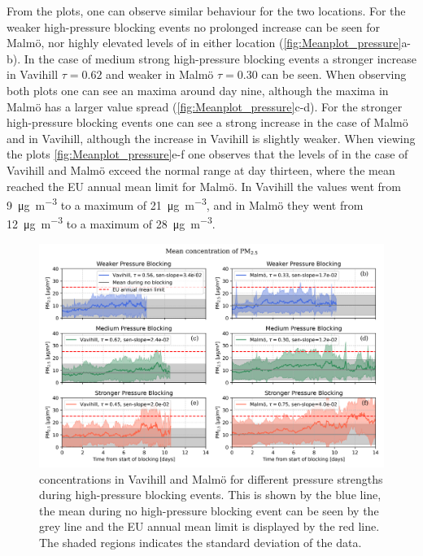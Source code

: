 From the plots, one can observe similar behaviour for the two locations. For the weaker high-pressure blocking events no prolonged increase can be seen for Malmö, nor highly elevated levels of \PM in either location (\autoref{fig:Meanplot_pressure}a-b). In the case of medium strong high-pressure blocking events a stronger increase in Vavihill $\tau=0.62$ and weaker in Malmö $\tau=0.30$ can be seen. When observing both plots one can see an maxima around day nine, although the maxima in Malmö has a larger value spread (\autoref{fig:Meanplot_pressure}c-d). For the stronger high-pressure blocking events one can see a strong increase in the case of Malmö and in Vavihill, although the increase in Vavihill is slightly weaker. When viewing the plots \autoref{fig:Meanplot_pressure}e-f one observes that the levels of \PM in the case of Vavihill and Malmö exceed the normal range at day thirteen, where the mean reached the EU annual mean limit for Malmö. In Vavihill the values went from \SI{9}{\micro\gram\per\meter\cubed} to a maximum of \SI{21}{\micro\gram\per\meter\cubed}, and in Malmö they went from \SI{12}{\micro\gram\per\meter\cubed} to a maximum of \SI{28}{\micro\gram\per\meter\cubed}. 


\begin{figure}[H]
        \centering
        \includegraphics[width=\textwidth]{Figures/Meanplot_pressure.png}
        \caption{\PM concentrations in Vavihill and Malmö for different pressure strengths during high-pressure blocking events. This is shown by the blue line, the mean during no high-pressure blocking event can be seen by the grey line and the EU annual mean limit is displayed by the red line. The shaded regions indicates the standard deviation of the data.}
        \label{fig:Meanplot_pressure}
\end{figure}
 

